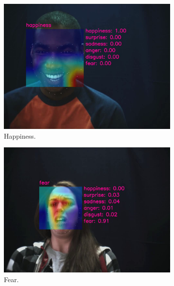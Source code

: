 \begin{figure}[ht]
  \centering
  \begin{subfigure}{0.24\linewidth}
    \includegraphics[width=\linewidth]{GiMeFive01.png}
    \caption{Happiness.}
    \label{fig:v1}
  \end{subfigure}
  \hfill
  \begin{subfigure}{0.24\linewidth}
    \includegraphics[width=\linewidth]{GiMeFive02.png}
    \caption{Fear.}
    \label{fig:v2}
  \end{subfigure}
  \hfill
  \begin{subfigure}{0.24\linewidth}

\end{subfigure}
\end{figure}
